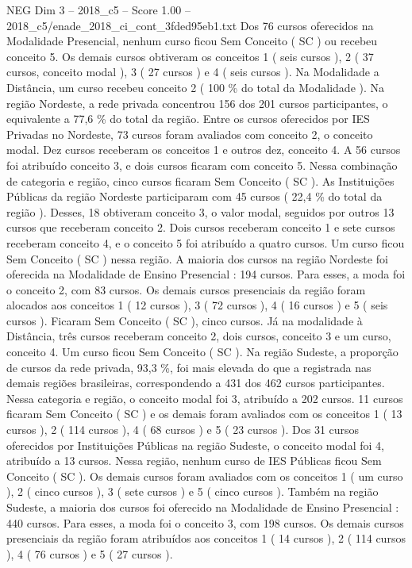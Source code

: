 \begin{textsample}{NEG Dim 3 – 2018\_c5 – Score 1.00 – 2018\_c5/enade\_2018\_ci\_cont\_3fded95eb1.txt}
Dos 76 cursos oferecidos na Modalidade Presencial, nenhum curso ficou Sem Conceito ( SC ) ou recebeu conceito 5.
Os demais cursos obtiveram os conceitos 1 ( seis cursos ), 2 ( 37 cursos, conceito modal ), 3 ( 27 cursos ) e 4 ( seis cursos ).
Na Modalidade a Distância, um curso recebeu conceito 2 ( 100 \% do total da Modalidade ).
Na região Nordeste, a rede privada concentrou 156 dos 201 cursos participantes, o equivalente a 77,6 \% do total da região.
Entre os cursos oferecidos por IES Privadas no Nordeste, 73 cursos foram avaliados com conceito 2, o conceito modal.
Dez cursos receberam os conceitos 1 e outros dez, conceito 4.
A 56 cursos foi atribuído conceito 3, e dois cursos ficaram com conceito 5.
Nessa combinação de categoria e região, cinco cursos ficaram Sem Conceito ( SC ).
As Instituições Públicas da região Nordeste participaram com 45 cursos ( 22,4 \% do total da região ).
Desses, 18 obtiveram conceito 3, o valor modal, seguidos por outros 13 cursos que receberam conceito 2.
Dois cursos receberam conceito 1 e sete cursos receberam conceito 4, e o conceito 5 foi atribuído a quatro cursos.
Um curso ficou Sem Conceito ( SC ) nessa região.
A maioria dos cursos na região Nordeste foi oferecida na Modalidade de Ensino Presencial : 194 cursos.
Para esses, a moda foi o conceito 2, com 83 cursos.
Os demais cursos presenciais da região foram alocados aos conceitos 1 ( 12 cursos ), 3 ( 72 cursos ), 4 ( 16 cursos ) e 5 ( seis cursos ).
Ficaram Sem Conceito ( SC ), cinco cursos.
Já na modalidade à Distância, três cursos receberam conceito 2, dois cursos, conceito 3 e um curso, conceito 4.
Um curso ficou Sem Conceito ( SC ).
Na região Sudeste, a proporção de cursos da rede privada, 93,3 \%, foi mais elevada do que a registrada nas demais regiões brasileiras, correspondendo a 431 dos 462 cursos participantes.
Nessa categoria e região, o conceito modal foi 3, atribuído a 202 cursos. 11 cursos ficaram Sem Conceito ( SC ) e os demais foram avaliados com os conceitos 1 ( 13 cursos ), 2 ( 114 cursos ), 4 ( 68 cursos ) e 5 ( 23 cursos ).
Dos 31 cursos oferecidos por Instituições Públicas na região Sudeste, o conceito modal foi 4, atribuído a 13 cursos.
Nessa região, nenhum curso de IES Públicas ficou Sem Conceito ( SC ).
Os demais cursos foram avaliados com os conceitos 1 ( um curso ), 2 ( cinco cursos ), 3 ( sete cursos ) e 5 ( cinco cursos ).
Também na região Sudeste, a maioria dos cursos foi oferecido na Modalidade de Ensino Presencial : 440 cursos.
Para esses, a moda foi o conceito 3, com 198 cursos.
Os demais cursos presenciais da região foram atribuídos aos conceitos 1 ( 14 cursos ), 2 ( 114 cursos ), 4 ( 76 cursos ) e 5 ( 27 cursos ).

\end{textsample}
